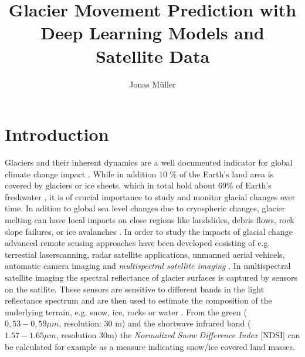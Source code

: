 \documentclass[12pt]{article}
\begin{document}
	
\title{Glacier Movement Prediction with Deep Learning Models and Satellite Data}
\author{Jonas Müller}
\maketitle

\begin{abstract}

\end{abstract}


\tableofcontents
\section{Introduction}
Glaciers and their inherent dynamics are a well documented indicator for global climate change impact \citep{abram2019framing, zemp2008global, avian2020status,dyurgerov2000twentieth, stoffel2012effects,shrestha2015integrated, mazhar2021effects, scambos2017much, yu2023bibliometric, berthier2023measuring}. While in addition 10 \% of the Earth’s land area is covered by glaciers or ice sheets, which in total hold about 69\% of Earth’s freshwater \citep{gleick1996water}, it is of crucial importance to study and monitor glacial changes over time. In adition to global sea level changes due to cryospheric changes, glacier melting can have local impacts on close regions like landslides, debris flows, rock slope failures, or ice avalanches \citep{stoffel2012effects}. In order to study the impacts of glacial change advanced remote sensing approaches have been developed cosisting of e.g. terrestial laserscanning, radar satellite applications, unmanned aerial vehicels, automatic camera imaging and \textit{multispectral satellite imaging} \citep{avian2020status}. In multispectral satellite imaging the spectral reflectance of glacier surfaces is captured by sensors on the satllite. These sensors are sensitive to different bands in the light reflectance spectrum and are then used to estimate the composition of the underlying terrain, e.g. snow, ice, rocks or water \citep{kaab2014glacier}. From the green ($0,53-0,59 \mu m $, resolution: 30 m) and the shortwave infrared band ($1.57-1.65 \mu m$, resolution 30m) the \textit{Normalized Snow Difference Index} [NDSI] can be calculated for example as a measure indicating snow/ice covered land masses.
\end{document}
